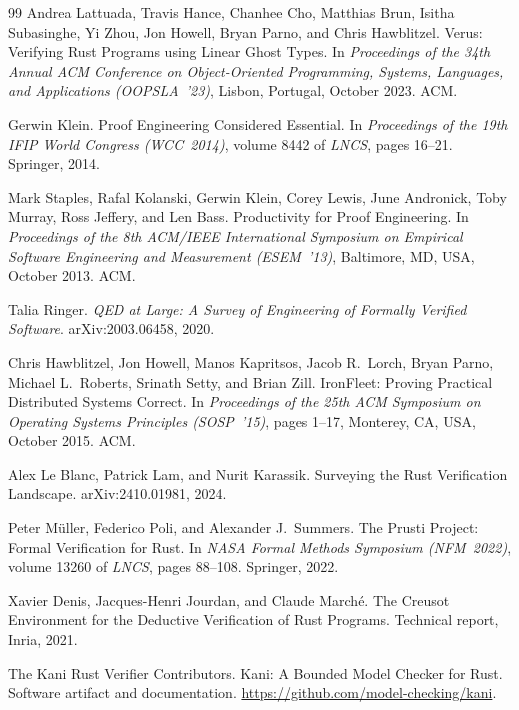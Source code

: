 \documentclass[10pt]{article}
\begin{document}
\begin{thebibliography}{99}
Andrea Lattuada, Travis Hance, Chanhee Cho, Matthias Brun,
Isitha Subasinghe, Yi Zhou, Jon Howell, Bryan Parno, and
Chris Hawblitzel.
\newblock Verus: Verifying Rust Programs using Linear Ghost Types.
\newblock In \emph{Proceedings of the 34th Annual ACM Conference on
Object-Oriented Programming, Systems, Languages, and Applications
(OOPSLA~'23)}, Lisbon, Portugal, October 2023. ACM.

Gerwin Klein.
\newblock Proof Engineering Considered Essential.
\newblock In \emph{Proceedings of the 19th IFIP World Congress
(WCC~2014)}, volume 8442 of \emph{LNCS}, pages 16--21. Springer, 2014.

Mark Staples, Rafal Kolanski, Gerwin Klein, Corey Lewis,
June Andronick, Toby Murray, Ross Jeffery, and Len Bass.
\newblock Productivity for Proof Engineering.
\newblock In \emph{Proceedings of the 8th ACM/IEEE International
Symposium on Empirical Software Engineering and Measurement
(ESEM~'13)}, Baltimore, MD, USA, October 2013. ACM.

Talia Ringer.
\newblock \emph{QED at Large: A Survey of Engineering of Formally
Verified Software}.
\newblock arXiv:2003.06458, 2020.

Chris Hawblitzel, Jon Howell, Manos Kapritsos, Jacob R.\ Lorch,
Bryan Parno, Michael L.\ Roberts, Srinath Setty, and Brian Zill.
\newblock IronFleet: Proving Practical Distributed Systems Correct.
\newblock In \emph{Proceedings of the 25th ACM Symposium on Operating
Systems Principles (SOSP~'15)}, pages 1--17, Monterey, CA, USA,
October 2015. ACM.

Alex Le Blanc, Patrick Lam, and Nurit Karassik.
\newblock Surveying the Rust Verification Landscape.
\newblock arXiv:2410.01981, 2024.

Peter M\"uller, Federico Poli, and Alexander J.\ Summers.
\newblock The Prusti Project: Formal Verification for Rust.
\newblock In \emph{NASA Formal Methods Symposium (NFM~2022)}, volume
13260 of \emph{LNCS}, pages 88--108. Springer, 2022.

Xavier Denis, Jacques-Henri Jourdan, and Claude March\'e.
\newblock The Creusot Environment for the Deductive Verification of
Rust Programs.
\newblock Technical report, Inria, 2021.

The Kani Rust Verifier Contributors.
\newblock Kani: A Bounded Model Checker for Rust.
\newblock Software artifact and documentation.
\newblock \url{https://github.com/model-checking/kani}.


\end{thebibliography}
\end{document}

